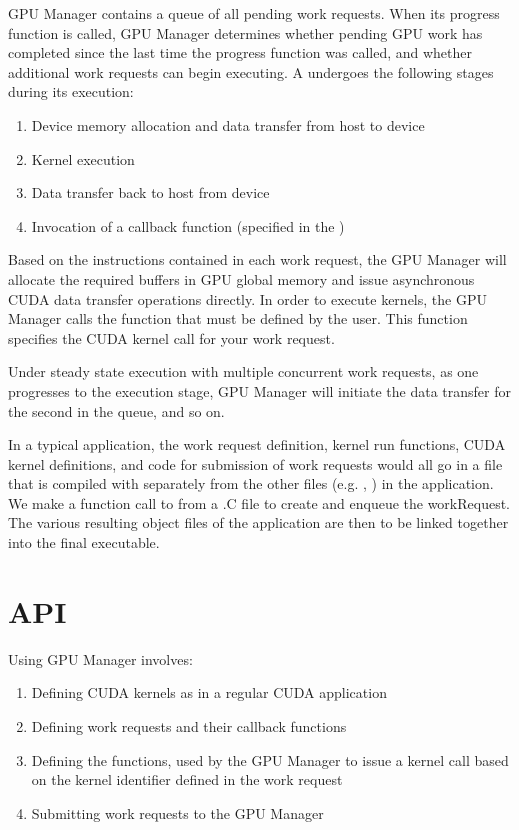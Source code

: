 GPU Manager contains a queue of all pending work requests. When its progress
function is called, GPU Manager determines whether pending GPU work has
completed since the last time the progress function was called, and whether
additional work requests can begin executing. A  undergoes the
following stages during its execution:

\begin{enumerate}
\item Device memory allocation and data transfer from host to device
\item Kernel execution
\item Data transfer back to host from device
\item Invocation of a callback function (specified in the )
\end{enumerate}

Based on the instructions contained in each work request, the GPU Manager will
allocate the required buffers in GPU global memory and issue asynchronous CUDA
data transfer operations directly. In order to execute kernels, the GPU Manager
calls the  function that must be defined by the user. This
function specifies the CUDA kernel call for your work request.

Under steady state execution with multiple concurrent work requests, as
one  progresses to the execution stage, GPU Manager will
initiate the data transfer for the second
 in the queue, and so on.

In a typical application, the work request definition,
kernel run functions, CUDA kernel definitions, and code for submission
of work requests would all go in a  file that is compiled with
 separately from the other files (e.g. , ) in the
\charmpp{} application.
We make a function call to  from a .C file to create
and enqueue the workRequest.
The various resulting object files of the application are then to be linked
together into the final executable.


\section{API}

Using GPU Manager involves:
\begin{enumerate}
\item Defining CUDA kernels as in a regular CUDA application
\item Defining work requests and their callback functions
\item Defining the  functions, used by the GPU Manager to issue a kernel call based on the kernel identifier defined in the work request
\item Submitting work requests to the GPU Manager
\end{enumerate}

